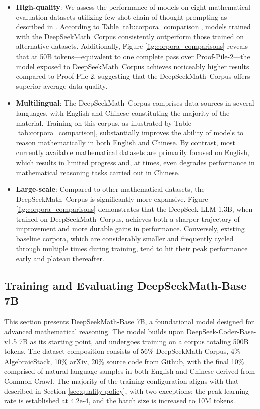 \begin{itemize}[topsep=0pt]
\begin{itemize}[topsep=0pt]
    \item \textbf{High-quality}:  
    We assess the performance of models on eight mathematical evaluation datasets utilizing few-shot chain-of-thought prompting as described in \cite{cot}. According to Table \ref{tab:corpora_comparison}, models trained with the DeepSeekMath~Corpus consistently outperform those trained on alternative datasets. Additionally, Figure \ref{fig:corpora_comparisons} reveals that at 50B tokens—equivalent to one complete pass over Proof-Pile-2—the model exposed to DeepSeekMath~Corpus achieves noticeably higher results compared to Proof-Pile-2, suggesting that the DeepSeekMath~Corpus offers superior average data quality.
    \item \textbf{Multilingual}:  
    The DeepSeekMath~Corpus comprises data sources in several languages, with English and Chinese constituting the majority of the material. Training on this corpus, as illustrated by Table \ref{tab:corpora_comparison}, substantially improves the ability of models to reason mathematically in both English and Chinese. By contrast, most currently available mathematical datasets are primarily focused on English, which results in limited progress and, at times, even degrades performance in mathematical reasoning tasks carried out in Chinese.
    \item \textbf{Large-scale}:  
    Compared to other mathematical datasets, the DeepSeekMath~Corpus is significantly more expansive. Figure \ref{fig:corpora_comparisons} demonstrates that the DeepSeek-LLM 1.3B, when trained on DeepSeekMath~Corpus, achieves both a sharper trajectory of improvement and more durable gains in performance. Conversely, existing baseline corpora, which are considerably smaller and frequently cycled through multiple times during training, tend to hit their peak performance early and plateau thereafter.
\end{itemize}

\subsection{Training and Evaluating DeepSeekMath-Base 7B}

This section presents DeepSeekMath-Base 7B, a foundational model designed for advanced mathematical reasoning. The model builds upon DeepSeek-Coder-Base-v1.5 7B \citep{deepseek-coder} as its starting point, and undergoes training on a corpus totaling 500B tokens. The dataset composition consists of 56\% DeepSeekMath Corpus, 4\% AlgebraicStack, 10\% arXiv, 20\% source code from Github, with the final 10\% comprised of natural language samples in both English and Chinese derived from Common Crawl. The majority of the training configuration aligns with that described in Section \ref{sec:quality-policy}, with two exceptions: the peak learning rate is established at 4.2e-4, and the batch size is increased to 10M tokens.


\end{itemize}
